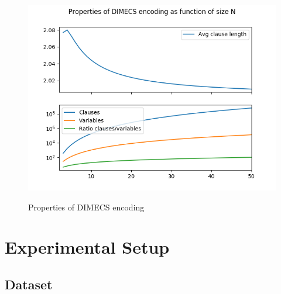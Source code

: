 \documentclass{article}
\begin{document}
\begin{figure}
  \centering
  \includegraphics[width=.9\textwidth]{dimecs_props}
  \label{fig_dimecs_props}
  \caption{Properties of DIMECS encoding}
\end{figure}

\section{Experimental Setup}

\subsection{Dataset}
\end{document}
